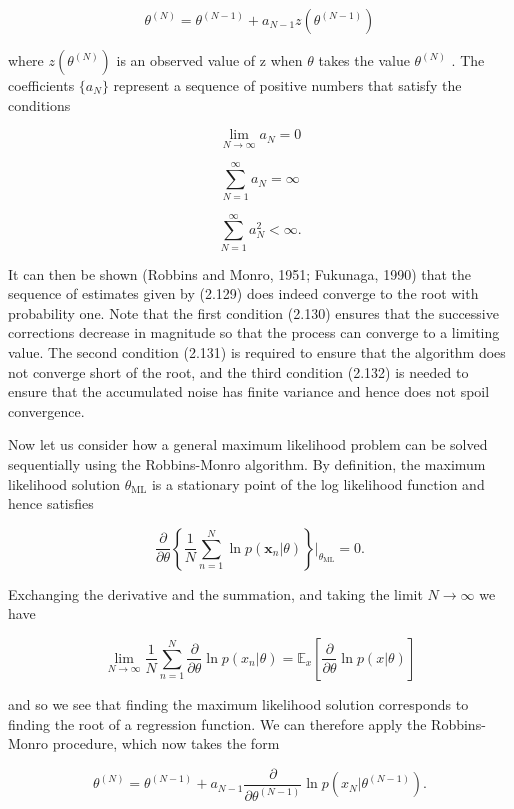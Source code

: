 \documentclass[
  10
]{article}
\begin{document}
\[
\theta^ {(N)} = \theta^ {(N - 1)} + a _ {N - 1} z (\theta^ {(N - 1)})\tag{2.129}
\]

where \(z ( \theta ^ { ( N ) } )\) is an observed value of z when
\(\theta\) takes the value \(\theta ^ { ( N ) }\) . The coefficients
\(\{ a _ { N } \}\) represent a sequence of positive numbers that
satisfy the conditions

\[
\lim _ {N \to \infty} a _ {N} = 0\tag{2.130}
\]

\[
\sum_ {N = 1} ^ {\infty} a _ {N} = \infty\tag{2.131}
\]

\[
\sum_ {N = 1} ^ {\infty} a _ {N} ^ {2} <   \infty .\tag{2.132}
\]

It can then be shown (Robbins and Monro, 1951; Fukunaga, 1990) that the
sequence of estimates given by (2.129) does indeed converge to the root
with probability one. Note that the first condition (2.130) ensures that
the successive corrections decrease in magnitude so that the process can
converge to a limiting value. The second condition (2.131) is required
to ensure that the algorithm does not converge short of the root, and
the third condition (2.132) is needed to ensure that the accumulated
noise has finite variance and hence does not spoil convergence.

Now let us consider how a general maximum likelihood problem can be
solved sequentially using the Robbins-Monro algorithm. By definition,
the maximum likelihood solution \(\theta _ { \mathrm { M L } }\) is a
stationary point of the log likelihood function and hence satisfies

\[
\frac {\partial}{\partial \theta} \left\{\frac {1}{N} \sum_ {n = 1} ^ {N} \ln p (\mathbf {x} _ {n} | \theta) \right\} \Bigg | _ {\theta_ {\mathrm{ML}}} = 0.\tag{2.133}
\]

Exchanging the derivative and the summation, and taking the limit
\(N \to \infty\) we have

\[
\lim _ {N \to \infty} \frac {1}{N} \sum_ {n = 1} ^ {N} \frac {\partial}{\partial \theta} \ln p (x _ {n} | \theta) = \mathbb {E} _ {x} \left[ \frac {\partial}{\partial \theta} \ln p (x | \theta) \right]\tag{2.134}
\]

and so we see that finding the maximum likelihood solution corresponds
to finding the root of a regression function. We can therefore apply the
Robbins-Monro procedure, which now takes the form

\[
\theta^ {(N)} = \theta^ {(N - 1)} + a _ {N - 1} \frac {\partial}{\partial \theta^ {(N - 1)}} \ln p (x _ {N} | \theta^ {(N - 1)}).\tag{2.135}
\]
\end{document}

